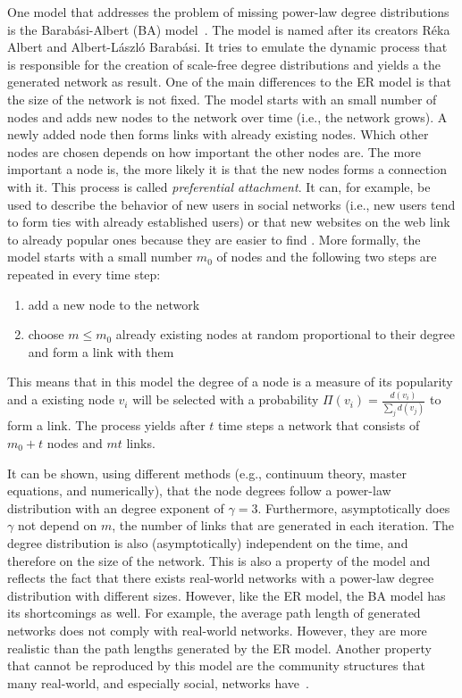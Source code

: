One model that addresses the problem of missing power-law degree distributions is the Barabási-Albert (BA) model~\cite{Barabasi2002}.
The model is named after its creators Réka Albert and Albert-László Barabási.
It tries to emulate the dynamic process that is responsible for the creation of scale-free degree distributions and yields a the generated network as result.
One of the main differences to the ER model is that the size of the network is not fixed.
The model starts with an small number of nodes and adds new nodes to the network over time (i.e., the network grows).
A newly added node then forms links with already existing nodes.
Which other nodes are chosen depends on how important the other nodes are.
The more important a node is, the more likely it is that the new nodes forms a connection with it.
This process is called \emph{preferential attachment}.
It can, for example, be used to describe the behavior of new users in social networks (i.e., new users tend to form ties with already established users) or that new websites on the web link to already popular ones because they are easier to find .
More formally, the model starts with a small number \(m_{0}\) of nodes and the following two steps are repeated in every time step:


\begin{enumerate}
    \item add a new node to the network
    \item choose \(m \leq m_{0}\) already existing nodes at random proportional to their degree and form a link with them
\end{enumerate}

This means that in this model the degree of a node is a measure of its popularity  and a existing node \(v_{i}\) will be selected with a probability \(\Pi(v_{i})=\frac{d(v_{i})}{\sum_{j} d(v_{j})}\) to form a link.
The process yields after \(t\) time steps a network that consists of \(m_{0} + t\) nodes and \(mt\) links.

It can be shown, using different methods (e.g., continuum theory, master equations, and numerically), that the node degrees follow a power-law distribution with an degree exponent of \(\gamma = 3\).
Furthermore, asymptotically does \(\gamma\) not depend on \(m\), the number of links that are generated in each iteration.
The degree distribution is also (asymptotically) independent on the time, and therefore on the size of the network.
This is also a property of the model and reflects the fact that there exists real-world networks with a power-law degree distribution with different sizes.
However, like the ER model, the BA model has its shortcomings as well.
For example, the average path length of generated networks does not comply with real-world networks.
However, they are more realistic than the path lengths generated by the ER model.
Another property that cannot be reproduced by this model are the community structures that many real-world, and especially social, networks have~\cite{Reid2011}.

